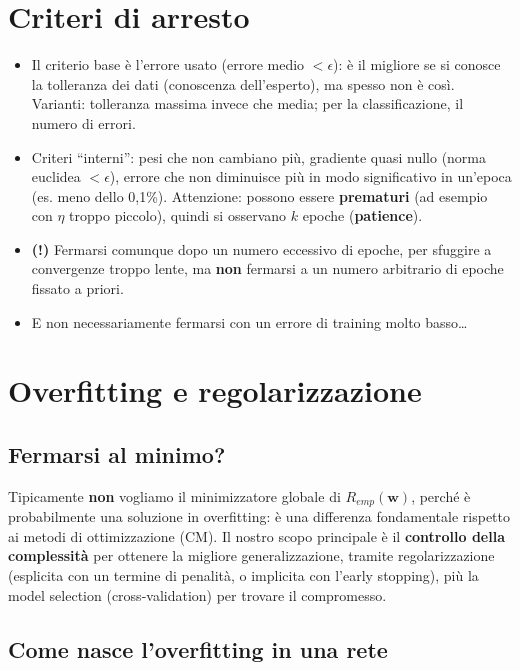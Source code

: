 \section{Criteri di arresto}\label{criteri-di-arresto}

\begin{itemize}
\tightlist
\item
  Il criterio base è l'errore usato (errore medio \(< \epsilon\)): è il
  migliore se si conosce la tolleranza dei dati (conoscenza
  dell'esperto), ma spesso non è così. Varianti: tolleranza massima
  invece che media; per la classificazione, il numero di errori.
\item
  Criteri ``interni'': pesi che non cambiano più, gradiente quasi nullo
  (norma euclidea \(< \epsilon\)), errore che non diminuisce più in modo
  significativo in un'epoca (es. meno dello 0,1\%). Attenzione: possono
  essere \textbf{prematuri} (ad esempio con \(\eta\) troppo piccolo),
  quindi si osservano \(k\) epoche (\textbf{patience}).
\item
  \textbf{(!)} Fermarsi comunque dopo un numero eccessivo di epoche, per
  sfuggire a convergenze troppo lente, ma \textbf{non} fermarsi a un
  numero arbitrario di epoche fissato a priori.
\item
  E non necessariamente fermarsi con un errore di training molto
  basso\ldots{}
\end{itemize}

\section{Overfitting e
regolarizzazione}\label{overfitting-e-regolarizzazione}

\subsection{Fermarsi al minimo?}\label{fermarsi-al-minimo}

Tipicamente \textbf{non} vogliamo il minimizzatore globale di
\(R_{emp}(\mathbf{w})\), perché è probabilmente una soluzione in
overfitting: è una differenza fondamentale rispetto ai metodi di
ottimizzazione (CM). Il nostro scopo principale è il \textbf{controllo
della complessità} per ottenere la migliore generalizzazione, tramite
regolarizzazione (esplicita con un termine di penalità, o implicita con
l'early stopping), più la model selection (cross-validation) per trovare
il compromesso.

\subsection{Come nasce l'overfitting in una
rete}\label{come-nasce-loverfitting-in-una-rete}

